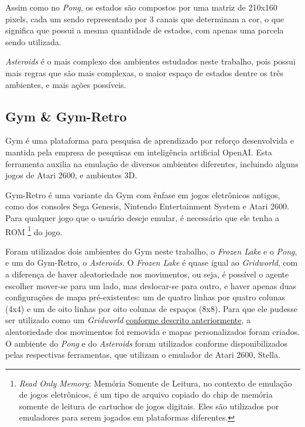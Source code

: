 Assim como no \textit{Pong}, os estados são compostos por uma matriz de 210x160 pixels, cada um sendo representado por 3 canais que determinam a cor, o que significa que possui a mesma quantidade de estados, com apenas uma parcela sendo utilizada.

\textit{Asteroids} é o mais complexo dos ambientes estudados neste trabalho, pois possui mais regras que são mais complexas, o maior espaço de estados dentre os três ambientes, e mais ações possíveis. 


\subsection{Gym \& Gym-Retro}
\label{sec:gymretro}

Gym é uma plataforma para pesquisa de aprendizado por reforço desenvolvida e mantida pela empresa de pesquisas em inteligência artificial OpenAI.
Esta ferramenta auxilia na emulação de diversos ambientes diferentes, incluindo alguns jogos de Atari 2600, e ambientes 3D.

Gym-Retro é uma variante da Gym com ênfase em jogos eletrônicos antigos, como dos consoles Sega Genesis, Nintendo Entertainment System e Atari 2600.
Para qualquer jogo que o usuário deseje emular, é necessário que ele tenha a ROM \footnote{\textit{Read Only Memory}: Memória Somente de Leitura, no contexto de emulação de jogos eletrônicos, é um tipo de arquivo copiado do chip de memória somente de leitura de cartuchos de jogos digitais. Eles são utilizados por emuladores para serem jogados em plataformas diferentes.} do jogo.

Foram utilizados dois ambientes do Gym neste trabalho, o \textit{Frozen Lake} e o \textit{Pong}, e um do Gym-Retro, o \textit{Asteroids}.
O \textit{Frozen Lake} é quase igual ao \textit{Gridworld}, com a diferença de haver aleatoriedade nos movimentos, ou seja, é possível o agente escolher mover-se para um lado, mas deslocar-se para outro, e haver apenas duas configurações de mapa pré-existentes: um de quatro linhas por quatro colunas (4x4) e um de oito linhas por oito colunas de espaços (8x8).
Para que ele pudesse ser utilizado como um \textit{Gridworld} \hyperref[sec:gridworld]{conforme descrito anteriormente}, a aleatoriedade dos movimentos foi removida e mapas personalizados foram criados.
O ambiente do \textit{Pong} e do \textit{Asteroids} foram utilizados conforme disponibilizados pelas respectivas ferramentas, que utilizam o emulador de Atari 2600, Stella.

